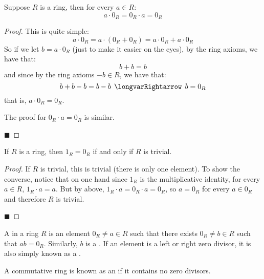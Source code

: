 \documentclass[10pt]{article}
\def\implies{\,\mathrel{\longvarRightarrow}\,}
\begin{document}
\begin{prop*}

    Suppose $R$ is a ring, then for every $a\in R$:
    \[ a\cdot0_R=0_R\cdot a = 0_R \]

\end{prop*}

\begin{proof}

    This is quite simple:
    \[ a\cdot0_R = a\cdot(0_R+0_R) = a\cdot0_R + a\cdot0_R \]
    So if we let $b=a\cdot0_R$ (just to make it easier on the eyes), by the ring axioms, we have that:
    \[ b+b = b \]
    and since by the ring axioms $-b\in R$, we have that:
    \[ b+b-b = b-b \implies b=0_R \]
    that is, $a\cdot0_R=0_R$.

    The proof for $0_R\cdot a=0_R$ is similar.

    \hfill$\blacksquare$

\end{proof}

\begin{prop*}

    If $R$ is a ring, then $1_R=0_R$ if and only if $R$ is trivial.

\end{prop*}

\begin{proof}

    If $R$ is trivial, this is trivial (there is only one element).
    To show the converse, notice that on one hand since $1_R$ is the multiplicative identity, for every $a\in R$, $1_R\cdot a=a$.
    But by above, $1_R\cdot a=0_R\cdot a=0_R$, so $a=0_R$ for every $a\in0_R$ and therefore $R$ is trivial.

    \hfill$\blacksquare$

\end{proof}

\begin{defn*}

    A  in a ring $R$ is an element $0_R\neq a\in R$ such that there exists $0_R\neq b\in R$ such that $ab=0_R$.
    Similarly, $b$ is a .
    If an element is a left or right zero divisor, it is also simply known as a .

\end{defn*}

\begin{defn*}

    A commutative ring is known as an  if it contains no zero divisors.

\end{defn*}
\end{document}
